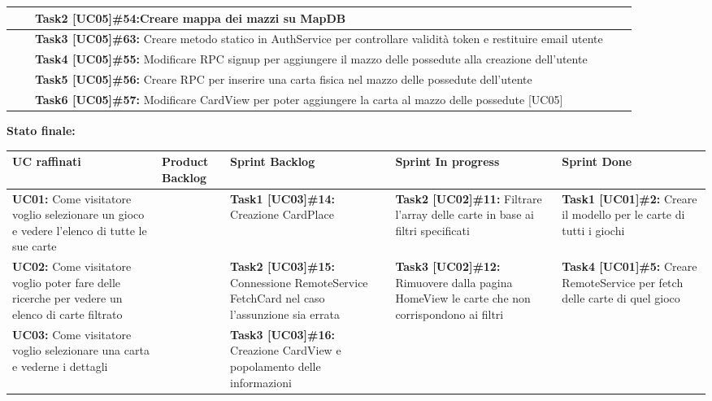 \documentclass{article}
\begin{document}
\begin{itemize}
\begin{tabular}{ | p{3.5cm} | p{1.5cm} | p{5cm} | p{1.6cm} | p{1.6cm} | }
            \hline
            & & \textbf{Task2 [UC05]\#54:}Creare mappa dei mazzi su MapDB  & & \\
            \hline
            & & \textbf{Task3 [UC05]\#63:} Creare metodo statico in AuthService per controllare validità token e restituire email utente  & & \\
            \hline
            & & \textbf{Task4 [UC05]\#55:} Modificare RPC signup per aggiungere il mazzo delle possedute alla creazione dell'utente  & & \\
            \hline
            & & \textbf{Task5 [UC05]\#56:} Creare RPC per inserire una carta fisica nel mazzo delle possedute dell'utente  & & \\
            \hline
            & & \textbf{Task6 [UC05]\#57:} Modificare CardView per poter aggiungere la carta al mazzo delle possedute [UC05] #57 & & \\
            \hline
        \end{tabular}
        \newpage
        \textbf{Stato finale:}
        \newline
        \newline
        \begin{tabular}{ | p{2.4cm} | p{1.4cm} | p{2.7cm} | p{3.4cm} | p{3cm} | }
            \hline
            \textbf{UC raffinati}
            & \textbf{Product Backlog}
            & \textbf{Sprint Backlog}
            & \textbf{Sprint In progress}
            & \textbf{Sprint Done} \\
            \hline
            \textbf{UC01:} Come visitatore voglio selezionare un gioco e vedere l'elenco di tutte le sue carte
            & & \textbf{Task1 [UC03]\#14:} Creazione CardPlace
            & \textbf{Task2 [UC02]\#11:} Filtrare l'array delle carte in base ai filtri specificati
            & \textbf{Task1 [UC01]\#2:} Creare il modello per le carte di tutti i giochi \\
            \hline
            \textbf{UC02:} Come visitatore voglio poter fare delle ricerche per vedere un elenco di carte filtrato
            & & \textbf{Task2 [UC03]\#15:} Connessione RemoteService FetchCard nel caso l'assunzione sia errata
            & \textbf{Task3 [UC02]\#12:} Rimuovere dalla pagina HomeView le carte che non corrispondono ai filtri
            & \textbf{Task4 [UC01]\#5:} Creare RemoteService per fetch delle carte di quel gioco \\
            \hline
            \textbf{UC03:} Come visitatore voglio selezionare una carta e vederne i dettagli
            & & \textbf{Task3 [UC03]\#16:} Creazione CardView e popolamento delle informazioni

\end{tabular}
\end{itemize}
\end{document}
